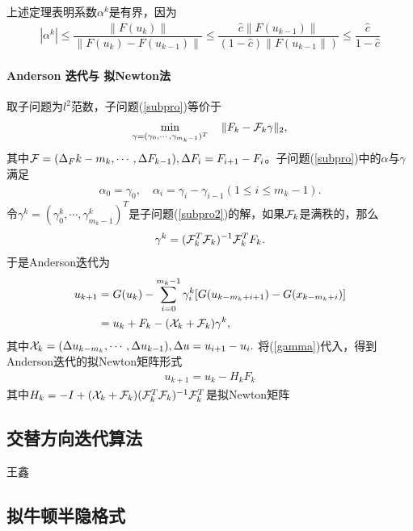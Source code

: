 	上述定理表明系数$ \alpha^k $是有界，因为
	\begin{align*}
	|\alpha^k| \leq \dfrac{\|F(u_k)\|}{\|F(u_k) - F(u_{k-1})\|}\leq \dfrac{\hat{c}\|F(u_{k-1})\|}{(1-\hat{c})\|F(u_{k-1}\|)} \leq \dfrac{\hat{c}}{1-\hat{c}}
	\end{align*}
	
	\paragraph{Anderson 迭代与 拟Newton法}
	取子问题为$l^2  $范数，子问题(\ref{subpro})等价于
	\begin{align}
	\min_{\gamma = (\gamma_0,\cdots,\gamma_{m_k - 1})^T} \quad \|F_k - \mathcal{F}_k\gamma\|_2,
	\label{subpro2}
	\end{align}
	其中$ \mathcal{F} = (\Delta_F{k-m_k}, \cdots, \Delta F_{k-1}) ,\Delta F_i = F_{i+1} - F_i $。子问题(\ref{subpro})中的$ \alpha $与$ \gamma $满足
	\begin{align*}
	\alpha_0 = \gamma_0,\quad \alpha_i = \gamma_i - \gamma_{i-1}(1\leq i\leq m_k-1).
	\end{align*}
	令$ \gamma^{k} = (\gamma_0^k,\cdots,\gamma^k_{m_k-1} )^T$是子问题(\ref{subpro2})的解，如果$ \mathcal{F}_k $是满秩的，那么
	\begin{align}
	\gamma^k = (\mathcal{F}_k^T\mathcal{F}_k)^{-1}\mathcal{F}_k^TF_k.
	\label{gamma}
	\end{align}
	于是Anderson迭代为
	\begin{align*}
	u_{k+1}& = G(u_k) - \sum_{i=0}^{m_k-1}\gamma_i^k[G(u_{k-m_k+i+1}) - G(x_{k-m_k + i})]\\
	& = u_k + F_k -(\mathcal{X}_k + \mathcal{F}_k)\gamma^k ,
	\end{align*}
	其中$\mathcal{X}_k= (\Delta u_{k-m_k},\cdots,\Delta u_{k-1})  ,\Delta u = u_{i+1} - u_i.$ 将(\ref{gamma})代入，得到 Anderson迭代的拟Newton矩阵形式
	\begin{align}
	u_{k+1} =  u_k - H_kF_k
	\end{align}
	其中$ H_k = -I +  (\mathcal{X}_k + \mathcal{F}_k)(\mathcal{F}_k^T\mathcal{F}_k)^{-1}\mathcal{F}_k^T$是拟Newton矩阵

\subsection{交替方向迭代算法}
{\color{red}\begin{center}
    王鑫
\end{center}}

\subsection{拟牛顿半隐格式}
